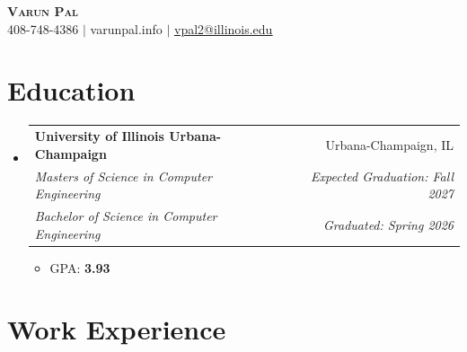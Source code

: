 \documentclass[letterpaper,11pt]{article}
\makeatletter
\newcommand{\resumeItem}[1]{
  \item\small{
    {#1 \vspace{-2pt}}
  }
}
\newcommand{\resumeSubheadingDual}[6]{
  \vspace{-2pt}\item
    \begin{tabular*}{0.97\textwidth}[t]{l@{\extracolsep{\fill}}r}
      \textbf{#1} & #2 \\
      \textit{\small#3} & \textit{\small #4} \\
      \textit{\small#5} & \textit{\small #6} \\
    \end{tabular*}\vspace{-7pt}
}
\newcommand{\resumeSubHeadingListStart}{\begin{itemize}[leftmargin=0.15in, label={}]}
\newcommand{\resumeSubHeadingListEnd}{\end{itemize}}
\newcommand{\resumeItemListStart}{\begin{itemize}[itemsep=0.5pt, topsep=1pt, parsep=0pt]}
\newcommand{\resumeItemListEnd}{\end{itemize}\vspace{-5pt}}
\newcommand{\courseList}[1]{
    \begin{tabular}{@{}p{0.30\textwidth}@{}p{0.30\textwidth}@{}p{0.30\textwidth}@{}}
    #1
    \end{tabular}
}
\makeatother
\begin{document}
\begin{center}
    \textbf{\Huge \scshape Varun Pal} \\ \vspace{1pt}
    \small 408-748-4386 $|$ varunpal.info $|$ \href{mailto:vpal2@illinois.edu} {\underline{vpal2@illinois.edu}}
\end{center}

\section{Education}
  \resumeSubHeadingListStart
    \resumeSubheadingDual
      {University of Illinois Urbana-Champaign}{Urbana-Champaign, IL}
      {Masters of Science in Computer Engineering}{Expected Graduation: Fall 2027}
      {Bachelor of Science in Computer Engineering}{Graduated: Spring 2026}
      \resumeItemListStart
        \resumeItem{GPA: \textbf{3.93}}
          
          

      \resumeItemListEnd
  \resumeSubHeadingListEnd

\section{Work Experience}
\end{document}
